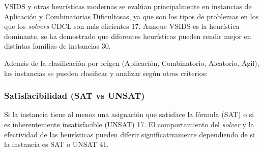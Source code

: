 VSIDS y otras heurísticas modernas se evalúan principalmente en instancias de Aplicación y Combinatorias Dificultosas, ya que son los tipos de problemas en los que los \textit{solvers} CDCL son más eficientes 17. Aunque VSIDS es la heurística dominante, se ha demostrado que diferentes heurísticas pueden rendir mejor en distintas familias de instancias 30.

Además de la clasificación por origen (Aplicación, Combinatorio, Aleatorio, Ágil), las instancias se pueden clasificar y analizar según otros criterios:

\subsubsection{Satisfacibilidad (SAT vs UNSAT)}
Si la instancia tiene al menos una asignación que satisface la fórmula (SAT) o si es inherentemente insatisfacible (UNSAT) 17. El comportamiento del \textit{solver} y la efectividad de las heurísticas pueden diferir significativamente dependiendo de si la instancia es SAT o UNSAT 41.

